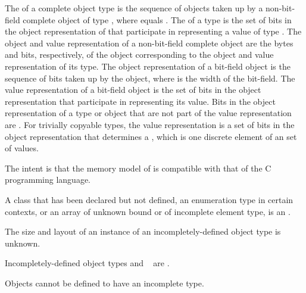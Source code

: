 \pnum
\label{term.object.representation}%
The 
of a complete object type  is the
sequence of   objects taken up
by a non-bit-field complete object of type ,
where  equals
.
The 
of a type  is the set of bits
in the object representation of 
that participate in representing a value of type .
The object and value representation of
a non-bit-field complete object are
the bytes and bits, respectively, of
the object corresponding to the object and value representation of its type.
The object representation of a bit-field object is
the sequence of  bits taken up by the object,
where  is the width of the bit-field.
The value representation of a bit-field object is
the set of bits in the object representation that
participate in representing its value.
\label{term.padding.bits}%
Bits in the object representation of a type or object that are
not part of the value representation
are .
For trivially copyable types, the value representation is
a set of bits in the object representation that determines a
, which is one discrete element of an
 set of values.
\begin{footnote}
The intent is that the memory model of \Cpp{} is compatible
with that of the C programming language.
\end{footnote}

\pnum
{}%
A class that has been declared but not defined, an enumeration type in certain
contexts, or an array of unknown
bound or of incomplete element type, is an
.
\begin{footnote}
The size and layout of an instance of an incompletely-defined
object type is unknown.
\end{footnote}
\label{term.incomplete.type}%
Incompletely-defined object types and \cv{}~ are
.
\begin{note}
Objects cannot be defined to have an incomplete type.
\end{note}

